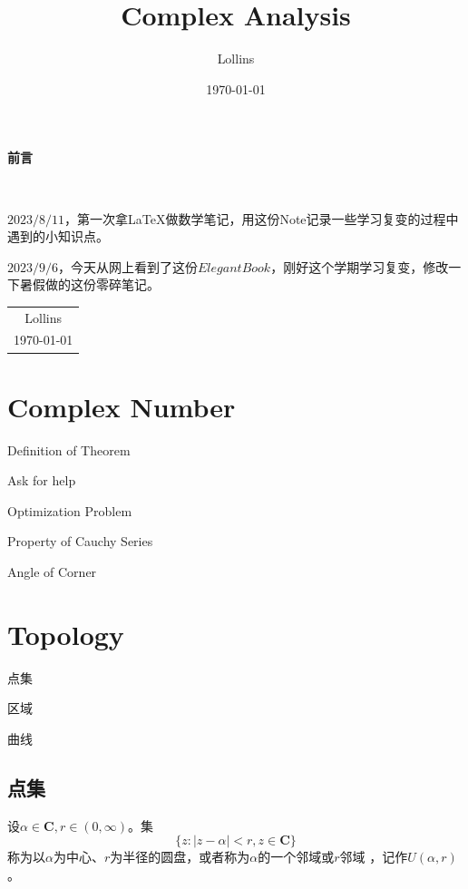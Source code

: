 \documentclass[lang=cn,10pt]{elegantbook}
\title{Complex Analysis}
\author{Lollins}
\date{\today}
\begin{document}
	
	\maketitle
	
	\begin{center}
		\Huge\textbf{前言}
	\end{center}~\
	
	$2023/8/11$，第一次拿\LaTeX 做数学笔记，用这份Note记录一些学习复变的过程中遇到的小知识点。
	
	$2023/9/6$，今天从网上看到了这份$ElegantBook$，刚好这个学期学习复变，修改一下暑假做的这份零碎笔记。
	~\\
	\begin{flushright}
		\begin{tabular}{c}
			Lollins \\
			\today
		\end{tabular}
	\end{flushright}
	
	
	\frontmatter
	
	\tableofcontents
	
	\mainmatter




\chapter{Complex Number}







\begin{introduction}
	\item Definition of Theorem
	\item Ask for help
	\item Optimization Problem
	\item Property of Cauchy Series
	\item Angle of Corner
\end{introduction}


\appendix
\chapter{Topology}
\begin{introduction}
	\item 点集
	\item 区域
	\item 曲线
\end{introduction}

\section{点集}
\begin{definition}[邻域]
	设$\alpha \in \mathbf{C},r \in (0,\infty)$。集
	\begin{equation}
		\{z:\mid z-\alpha\mid<r,z\in\mathbf{C}\}
	\end{equation}
	称为以$\alpha$为中心、$r$为半径的圆盘，$\text{或者称为}$$\alpha\text{的一个邻域或}r$邻域
		，记作$U(\alpha,r)$。
\end{definition}
\end{document}
